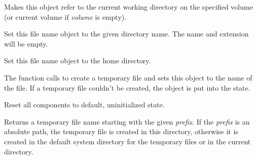 

\label{wxfilenameassigncwd}


Makes this object refer to the current working directory on the specified
volume (or current volume if {\it volume} is empty).



\label{wxfilenameassigndir}


Set this file name object to the given directory name. The name and extension
will be empty.

\label{wxfilenameassignhomedir}


Set this file name object to the home directory.

\label{wxfilenameassigntempfilename}


The function calls  to
create a temporary file and sets this object to the name of the file. If a
temporary file couldn't be created, the object is put into the\rtfsp
{} state.

\label{wxfilenameclear}


Reset all components to default, uninitialized state.

\label{wxfilenamecreatetempfilename}


Returns a temporary file name starting with the given {\it prefix}. If
the {\it prefix} is an absolute path, the temporary file is created in this
directory, otherwise it is created in the default system directory for the
temporary files or in the current directory.


